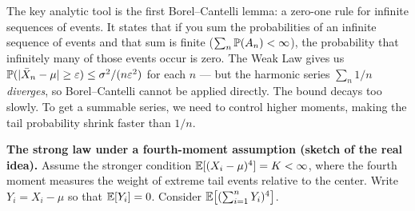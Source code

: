 The key analytic tool is the first Borel--Cantelli lemma: a zero-one rule for
infinite sequences of events. It states that if you sum the probabilities of an
infinite sequence of events and that sum is finite ($\sum_n \P(A_n) < \infty$),
the probability that infinitely many of those events occur is zero. The Weak Law gives us $\P(\abs{\bar X_n - \mu} \ge \eps) \le \sigma^2/(n\eps^2)$ for each $n$ --- but the harmonic series $\sum_n 1/n$ \emph{diverges}, so Borel--Cantelli cannot be applied directly. The bound decays too slowly. To get a summable series, we need to control higher moments, making the tail probability shrink faster than $1/n$.

\begin{whybox}
\textbf{The strong law under a fourth-moment assumption (sketch of the real idea).} Assume the stronger condition $\E[(X_i-\mu)^4] = K < \infty$, where the fourth moment measures the weight of extreme tail events relative to the center. Write $Y_i = X_i - \mu$ so that $\E[Y_i]=0$. Consider $\E\bigl[(\sum_{i=1}^n Y_i)^4\bigr]$.


\end{whybox}

